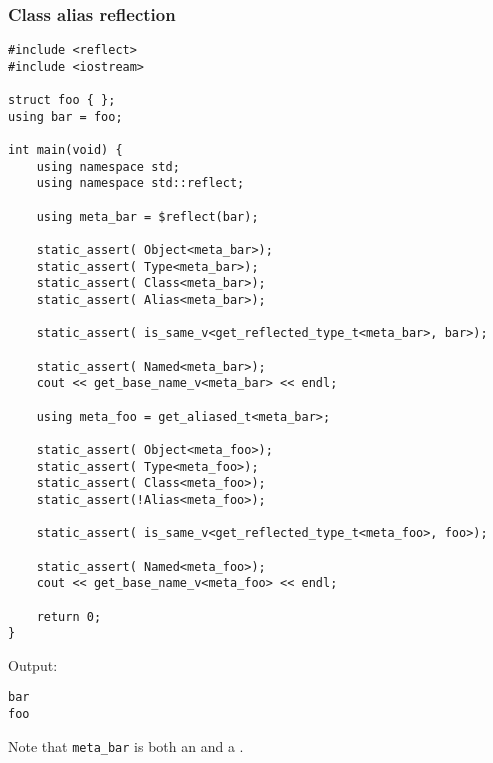 \subsubsection{Class alias reflection}

\begin{verbatim}
#include <reflect>
#include <iostream>

struct foo { };
using bar = foo;

int main(void) {
	using namespace std;
	using namespace std::reflect;

	using meta_bar = $reflect(bar);

	static_assert( Object<meta_bar>);
	static_assert( Type<meta_bar>);
	static_assert( Class<meta_bar>);
	static_assert( Alias<meta_bar>);

	static_assert( is_same_v<get_reflected_type_t<meta_bar>, bar>);

	static_assert( Named<meta_bar>);
	cout << get_base_name_v<meta_bar> << endl;

	using meta_foo = get_aliased_t<meta_bar>;

	static_assert( Object<meta_foo>);
	static_assert( Type<meta_foo>);
	static_assert( Class<meta_foo>);
	static_assert(!Alias<meta_foo>);

	static_assert( is_same_v<get_reflected_type_t<meta_foo>, foo>);

	static_assert( Named<meta_foo>);
	cout << get_base_name_v<meta_foo> << endl;

	return 0;
}
\end{verbatim}

Output:

\begin{verbatim}
bar
foo
\end{verbatim}

Note that \texttt{meta\_bar} is both an  and a .

